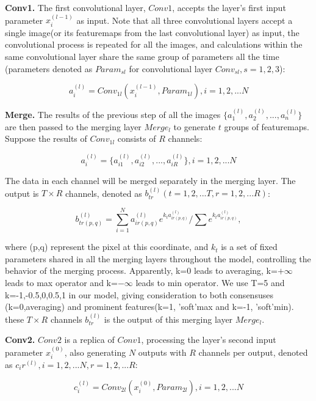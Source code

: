 

\vspace{1mm}
\noindent
\textbf{Conv1.} The first convolutional layer, $Conv1$, accepts the layer's first input parameter $x_i^{(l-1)}$ as input. Note that all three convolutional layers accept a single image(or its featuremaps from the last convolutional layer) as input, the convolutional process is repeated for all the images, and calculations within the same convolutional layer share the same group of parameters all the time (parameters denoted as $Param_{sl}$ for convolutional layer $Conv_{sl}, s=1,2,3$):

$$ a_i^{(l)} = Conv_{1l}(x_i^{(l-1)},Param_{1l}), i=1,2,...N$$

\vspace{1mm}
\noindent
\textbf{Merge.} The results of the previous step of all the images $\{a_1^{(l)},a_2^{(l)},...,a_n^{(l)}\}$ are then passed to the merging layer $Merge_l$ to generate $t$ groups of featuremaps. Suppose the results of $Conv_{1l}$ consists of $R$ channels:

$$ a_i^{(l)} = \{a_{i1}^{(l)},a_{i2}^{(l)},...,a_{iR}^{(l)}\}, i=1,2,...N$$

The data in each channel will be merged separately in the merging layer. The output is $T\times R$ channels, denoted as $b_{tr}^{(l)}(t=1,2,...T, r=1,2,...R)$:

$$ b_{tr(p,q)}^{(l)} = \sum_{i=1}^{N} a_{ir(p,q)}^{(l)} e^{k_t a_{ir(p,q)}^{(l)}} /\sum e^{k_t a_{ir(p,q)}^{(l)}},$$

where (p,q) represent the pixel at this coordinate, and $k_t$ is a set of fixed parameters shared in all the merging layers throughout the model, controlling the behavior of the merging process. Apparently, k=0 leads to averaging, k=${+\infty}$ leads to max operator and k=${-\infty}$ leads to min operator. We use T=5 and k=-1,-0.5,0,0.5,1 in our model, giving consideration to both consensuses (k=0,averaging) and prominent features(k=1, 'soft'max and k=-1, 'soft'min). these $T\times R$ channels $b_{tr}^{(l)}$ is the output of this merging layer $Merge_l$.

\vspace{1mm}
\noindent
\textbf{Conv2.} $Conv2$ is a replica of $Conv1$, processing the layer's second input parameter $x_i^{(0)}$, also generating $N$ outputs with $R$ channels per output, denoted as $c_ir^{(l)}, i=1,2,...N, r=1,2,...R$:

$$ c_i^{(l)} = Conv_{2l}(x_i^{(0)},Param_{2l}), i=1,2,...N$$

